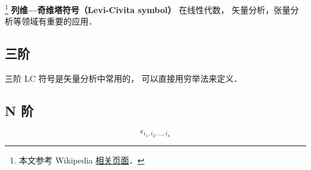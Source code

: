 
\footnote{本文参考 Wikipedia \href{https://en.wikipedia.org/wiki/Levi-Civita_symbol}{相关页面}．} \textbf{列维—奇维塔符号（Levi-Civita symbol）} 在线性代数， 矢量分析，张量分析等领域有重要的应用．

\subsection{三阶}
三阶 LC 符号是矢量分析中常用的， 可以直接用穷举法来定义．

\subsection{N 阶}
\begin{equation}
\epsilon_{i_1,i_2,\dots, i_n}
\end{equation}
